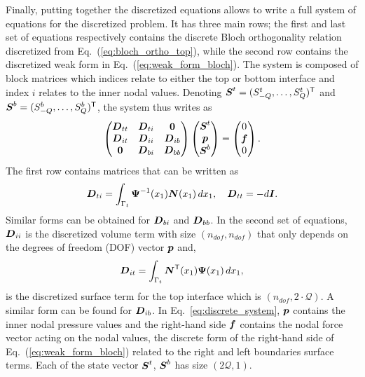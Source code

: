 Finally, putting together the discretized equations allows to write a full system of equations for the discretized problem. It has three main rows; the first and last set of equations respectively contains the discrete Bloch orthogonality relation discretized from Eq.~(\ref{eq:bloch_ortho_top}), while the second row contains the discretized weak form in Eq.~(\ref{eq:weak_form_bloch}). The system is composed of block matrices which indices relate to either the top or bottom interface and index $i$ relates to the inner nodal values. Denoting $\boldsymbol S^t = ( S_{-Q}^t, \ldots, S_Q^t )^\mathsf T$ and $\boldsymbol S^b = ( S_{-Q}^b, \ldots, S_Q^b )^\mathsf T$, the system thus writes as
\begin{equation}
    \begin{pmatrix}
        \boldsymbol D_{tt} & \boldsymbol D_{ti} & \boldsymbol 0      \\
        \boldsymbol D_{it} & \boldsymbol D_{ii} & \boldsymbol D_{ib} \\
        \boldsymbol 0      & \boldsymbol D_{bi} & \boldsymbol D_{bb} \\
    \end{pmatrix} \begin{pmatrix}
       \boldsymbol S^t \\ \boldsymbol p \\ \boldsymbol S^b
    \end{pmatrix} = \begin{pmatrix}
        0 \\ \boldsymbol f \\ 0
    \end{pmatrix}. 
    \label{eq:discrete_system}
\end{equation}
The first row contains matrices that can be written as
\begin{equation}
    \boldsymbol D_{ti} = \int_{\Gamma_t} \boldsymbol \Psi^{-1} (x_1) \boldsymbol N(x_1) \,dx_1, \quad \boldsymbol D_{tt} = - d \boldsymbol I.
\end{equation}
Similar forms can be obtained for $\boldsymbol D_{bi}$ and $\boldsymbol D_{bb}$. In the second set of equations, $\boldsymbol D_{ii}$ is the discretized volume term with size $(n_{dof}, n_{dof})$ that only depends on the degrees of freedom (DOF) vector $\boldsymbol p$ and,
\begin{equation}
     \boldsymbol D_{it} = \int_{\Gamma_t}\boldsymbol N^\mathsf T(x_1) \boldsymbol \Psi(x_1) \,dx_1, 
\end{equation}
is the discretized surface term for the top interface which is $(n_{dof}, 2\cdot \mathcal Q)$. A similar form can be found for $\boldsymbol D_{ib}$. In Eq.~\ref{eq:discrete_system}, $\boldsymbol p$ contains the inner nodal pressure values and the right-hand side $\boldsymbol f$ contains the nodal force vector acting on the nodal values, the discrete form of the right-hand side of Eq.~(\ref{eq:weak_form_bloch}) related to the right and left boundaries surface terms. Each of the state vector $\boldsymbol S^t$, $\boldsymbol S^b$ has size $(2\mathcal Q, 1)$.\\

